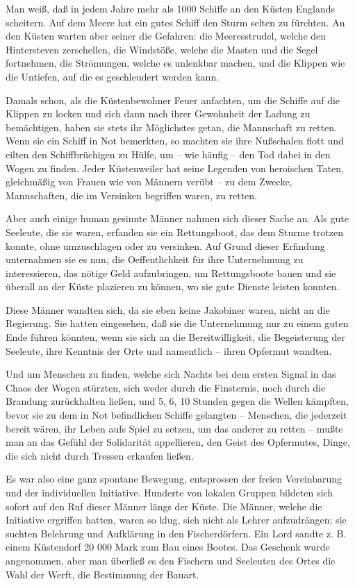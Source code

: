 \documentclass{scrbook}
\begin{document}
Man weiß, daß in jedem Jahre mehr als 1000 Schiffe an den Küsten Englands scheitern. Auf dem Meere hat ein gutes Schiff den Sturm selten zu fürchten. An den Küsten warten aber seiner die Gefahren: die Meeresstrudel, welche den Hintersteven zerschellen, die Windstöße, welche die Masten und die Segel fortnehmen, die Strömungen, welche es unlenkbar machen, und die Klippen wie die Untiefen, auf die es geschleudert werden kann.

Damals schon, als die Küstenbewohner Feuer anfachten, um die Schiffe auf die Klippen zu locken und sich dann nach ihrer Gewohnheit der Ladung zu bemächtigen, haben sie stets ihr Möglichstes getan, die Mannschaft zu retten. Wenn sie ein Schiff in Not bemerkten, so machten sie ihre Nußschalen flott und eilten den Schiffbrüchigen zu Hülfe, um – wie häufig – den Tod dabei in den Wogen zu finden. Jeder Küstenweiler hat seine Legenden von heroischen Taten, gleichmäßig von Frauen wie von Männern verübt – zu dem Zwecke, Mannschaften, die im Versinken begriffen waren, zu retten.

Aber auch einige human gesinnte Männer nahmen sich dieser Sache an. Als gute Seeleute, die sie waren, erfanden sie ein Rettungsboot, das dem Sturme trotzen konnte, ohne umzuschlagen oder zu versinken. Auf Grund dieser Erfindung unternahmen sie es nun, die Oeffentlichkeit für ihre Unternehmung zu interessieren, das nötige Geld aufzubringen, um Rettungsboote bauen und sie überall an der Küste plazieren zu können, wo sie gute Dienste leisten konnten.

Diese Männer wandten sich, da sie eben keine Jakobiner waren, nicht an die Regierung. Sie hatten eingesehen, daß sie die Unternehmung nur zu einem guten Ende führen könnten, wenn sie sich an die Bereitwilligkeit, die Begeisterung der Seeleute, ihre Kenntnis der Orte und namentlich – ihren Opfermut wandten.

Und um Menschen zu finden, welche sich Nachts bei dem ersten Signal in das Chaos der Wogen stürzten, sich weder durch die Finsternis, noch durch die Brandung zurückhalten ließen, und 5, 6, 10 Stunden gegen die Wellen kämpften, bevor sie zu dem in Not befindlichen Schiffe gelangten – Menschen, die jederzeit bereit wären, ihr Leben aufs Spiel zu setzen, um das anderer zu retten – mußte man an das Gefühl der Solidarität appellieren, den Geist des Opfermutes, Dinge, die sich nicht durch Tressen erkaufen ließen.

Es war also eine ganz spontane Bewegung, entsprossen der freien Vereinbarung und der individuellen Initiative. Hunderte von lokalen Gruppen bildeten sich sofort auf den Ruf dieser Männer längs der Küste. Die Männer, welche die Initiative ergriffen hatten, waren so klug, sich nicht als Lehrer aufzudrängen; sie suchten Belehrung und Aufklärung in den Fischerdörfern. Ein Lord sandte z. B. einem Küstendorf 20 000 Mark zum Bau eines Bootes. Das Geschenk wurde angenommen, aber man überließ es den Fischern und Seeleuten des Ortes die Wahl der Werft, die Bestimmung der Bauart.
\end{document}
